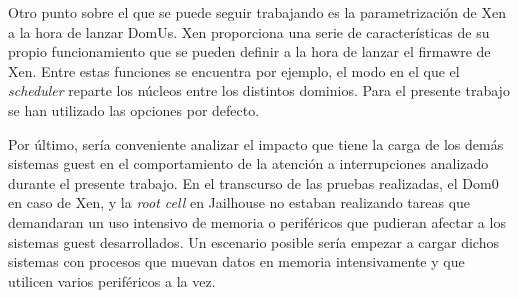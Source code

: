 Otro punto sobre el que se puede seguir trabajando es la parametrización de Xen a la hora de lanzar DomUs. Xen proporciona una serie de características de su propio funcionamiento que se pueden definir a la hora de lanzar el firmawre de Xen. Entre estas funciones se encuentra por ejemplo, el modo en el que el \textit{scheduler} reparte los núcleos entre los distintos dominios. Para el presente trabajo se han utilizado las opciones por defecto.

Por último, sería conveniente analizar el impacto que tiene la carga de los demás sistemas guest en el comportamiento de la atención a interrupciones analizado durante el presente trabajo. En el transcurso de las pruebas realizadas, el Dom0 en caso de Xen, y la \textit{root cell} en Jailhouse no estaban realizando tareas que demandaran un uso intensivo de memoria o periféricos que pudieran afectar a los sistemas guest desarrollados. Un escenario posible sería empezar a cargar dichos sistemas con procesos que muevan datos en memoria intensivamente y que utilicen varios periféricos a la vez.
